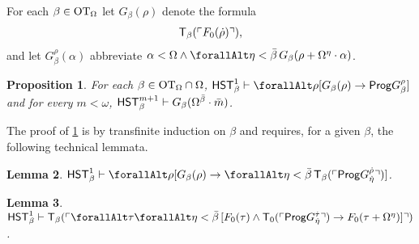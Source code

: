 \documentclass[UKenglish,cleveref,DIV=12]{scrartcl}
\let\forall\forallAlt
\newtheorem{lemma}{Lemma}
\newtheorem{proposition}[lemma]{Proposition}
\theoremstyle{definition}
\theoremstyle{definition}
\begin{document}
For each $\beta\in\mathrm{OT}_\Omega$ let $G_\beta(\rho)$ denote the formula
\begin{align*}
  \mathsf{T}_{\beta}(\ulcorner{F_0(\dot\rho)}\urcorner),
\end{align*}
and let $G_\beta^\rho(\alpha)$ abbreviate $\alpha<\Omega\land \forall\eta<\bar\beta\,G_\beta(\rho+\Omega^\eta\cdot\alpha)$.
\begin{proposition}\label{extlem:Fbetawellordering1}
 For each $\beta\in\mathrm{OT}_\Omega\cap\Omega$, $\HST_{\beta}^1\proves \forall\rho[G_\beta(\rho)\rightarrow \Prog G_\beta^\rho]$ and for every $m<\omega$, $\mathsf{HST}_{\beta}^{m+1}\vdash G_\beta(\Omega^{\bar\beta}\cdot\bar m)$.
\end{proposition}
The proof of \cref{extlem:Fbetawellordering1} is by transfinite induction on
$\beta$ and requires, for a given $\beta$, the following technical lemmata.
\begin{lemma}\label{extlem:Fbetatech1}
 $\HST_\beta^1\proves \forall\rho[G_\beta(\rho)\rightarrow \forall\eta<\bar\beta\,\T_\beta(\gn{\Prog G_{\dot\eta}^{\dot\rho}})]$.
\end{lemma}
\begin{lemma}\label{extlem:Fbetatech2}
  $\HST_\beta^1\proves \T_\beta(\gn{\forall\tau\forall\eta<\bar\beta\,[F_0(\tau)\land\T_0(\gn{\Prog G_{\dot\eta}^{\dot\tau}}) \rightarrow
  F_0(\tau+\Omega^{\eta})]})$.
\end{lemma}
\end{document}
